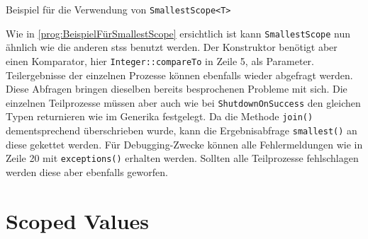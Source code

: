     \begin{program} [H]
        \caption{Beispiel für die Verwendung von \texttt{SmallestScope<T>}}
        \label{prog:VerwendungVonSmallestScope}
    \begin{JavaCode}[language=Java, numbers=left]
public static void scopesSmallest() {
    StructuredTaskScope.Subtask<Integer> result1 = null;
    Integer result = null;

    try (var scope = new SmallestScope<Integer>(Integer::compareTo)) {                                         
        result1 = scope.fork(() -> { 
            Thread.sleep(1000); 
            return 4; 
        });
        scope.fork(() -> { throw new RuntimeException("Task 2 failed"); });
        scope.fork(() -> { 
            Thread.sleep(2000); 
            return 3; 
        });

        result = scope.join().smallest();
        if (result1.state() == StructuredTaskScope.Subtask.State.SUCCESS) {
            System.out.println(STR."result from the 1st Thread: \{result1.get()}");
        }
        scope.exceptions().printStackTrace();
    } catch (Exception e) {
        e.printStackTrace();
    }
    System.out.println(STR."smallest result: \{result}");
}\end{JavaCode}
    \end{program}
    Wie in \ref{prog:BeispielFürSmallestScope} ersichtlich ist kann \texttt{SmallestScope} nun ähnlich wie die anderen \Glspl{sts} benutzt werden. Der Konstruktor benötigt
    aber einen Komparator, hier \texttt{Integer::compareTo} in Zeile 5, als Parameter. Teilergebnisse der einzelnen Prozesse können ebenfalls wieder abgefragt werden. Diese Abfragen
    bringen dieselben bereits besprochenen Probleme mit sich. Die einzelnen Teilprozesse müssen 
    aber auch wie bei \texttt{ShutdownOnSuccess} den gleichen Typen returnieren wie im Generika festgelegt. Da die Methode \texttt{join()} dementsprechend überschrieben
    wurde, kann die Ergebnisabfrage \texttt{smallest()} an diese gekettet werden. Für Debugging-Zwecke können alle Fehlermeldungen wie in Zeile 20 mit \texttt{exceptions()}
    erhalten werden. Sollten alle Teilprozesse fehlschlagen werden diese aber ebenfalls geworfen. 

\section{Scoped Values}                                 %
\label{sec:Scoped Values}
    
